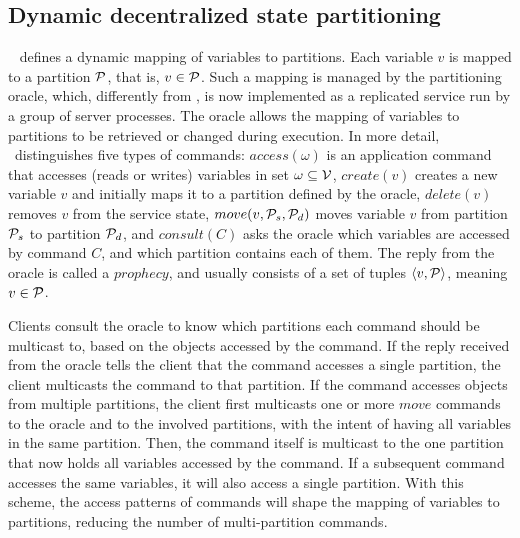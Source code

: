 \subsection{Dynamic decentralized state partitioning}

\dssmr{}~\cite{hoang2016} defines a dynamic mapping of variables to partitions.
Each variable $v$ is mapped to a partition $\mathcal{P}$, that is, $v \in \mathcal{P}$.
Such a mapping is managed by the partitioning oracle, which, differently from \ssmr, is now implemented as a replicated service run by a group of server processes.
The oracle allows the mapping of variables to partitions to be retrieved or changed during execution.
In more detail, \dssmr\ distinguishes five types of commands:
$access(\omega)$ is an application command that accesses (reads or writes) variables in set $\omega \subseteq \mathcal{V}$,
$create(v)$ creates a new variable $v$ and initially maps it to a partition defined by the oracle,
$delete(v)$ removes $v$ from the service state,
$move(v,\mathcal{P}_s,\mathcal{P}_d)$ moves variable $v$ from partition $\mathcal{P}_s$ to partition $\mathcal{P}_d$,
and $consult(C)$ asks the oracle which variables are accessed by command $C$, and which partition contains each of them.
The reply from the oracle is called a $prophecy$, and usually consists of a set of tuples $\langle v, \mathcal{P} \rangle$, meaning $v \in \mathcal{P}$.


Clients consult the oracle to know which partitions each command should be multicast to, based on the objects accessed by the command.
If the reply received from the oracle tells the client that the command accesses a single partition, the client multicasts the command to that partition.
If the command accesses objects from multiple partitions, the client first multicasts one or more $move$ commands to the oracle and to the involved partitions, with the intent of having all variables in the same partition.
Then, the command itself is multicast to the one partition that now holds all variables accessed by the command.
If a subsequent command accesses the same variables, it will also access a single partition.
With this scheme, the access patterns of commands will shape the mapping of variables to partitions, reducing the number of multi-partition commands.

